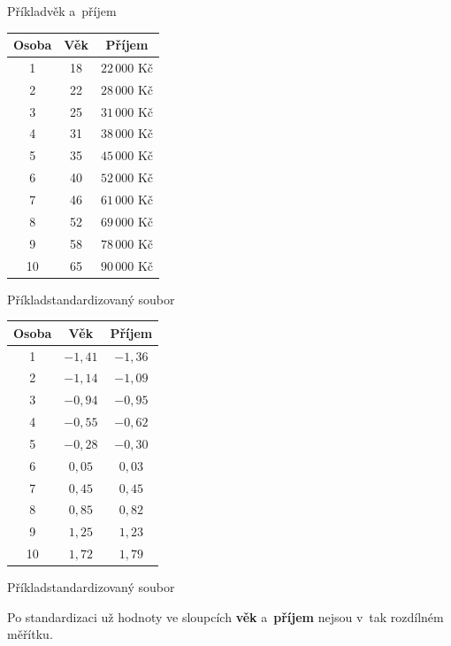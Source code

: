 \documentclass[11pt,professionalfont,aspectratio=43]{beamer}
\begin{document}
\begin{frame}{Příklad}{věk a~příjem}

\begin{center}
\begin{tabular}{c|c|c}
\textbf{Osoba} & \textbf{Věk} & \textbf{Příjem} \\
\hline
1 & 18 & $22\,000$ Kč \\
2 & 22 & $28\,000$ Kč \\
3 & 25 & $31\,000$ Kč \\
4 & 31 & $38\,000$ Kč \\
5 & 35 & $45\,000$ Kč \\
6 & 40 & $52\,000$ Kč \\
7 & 46 & $61\,000$ Kč \\
8 & 52 & $69\,000$ Kč \\
9 & 58 & $78\,000$ Kč \\
10 & 65 & $90\,000$ Kč
\end{tabular}
\end{center}

\end{frame}

\begin{frame}{Příklad}{standardizovaný soubor}

\begin{center}
\begin{tabular}{c|c|c}
\textbf{Osoba} & \textbf{Věk} & \textbf{Příjem} \\
\hline
1 & $-1{,}41$ & $-1{,}36$ \\
2 & $-1{,}14$ & $-1{,}09$ \\
3 & $-0{,}94$ & $-0{,}95$ \\
4 & $-0{,}55$ & $-0{,}62$ \\
5 & $-0{,}28$ & $-0{,}30$ \\
6 & $0{,}05$ & $0{,}03$ \\
7 & $0{,}45$ & $0{,}45$ \\
8 & $0{,}85$ & $0{,}82$ \\
9 & $1{,}25$ & $1{,}23$ \\
10 & $1{,}72$ & $1{,}79$
\end{tabular}
\end{center}

\end{frame}

\begin{frame}{Příklad}{standardizovaný soubor}

\begin{tinfoframe*}
Po standardizaci už hodnoty ve sloupcích \textbf{věk} a~\textbf{příjem}
nejsou v~tak rozdílném měřítku.
\end{tinfoframe*}

\end{frame}
\end{document}
